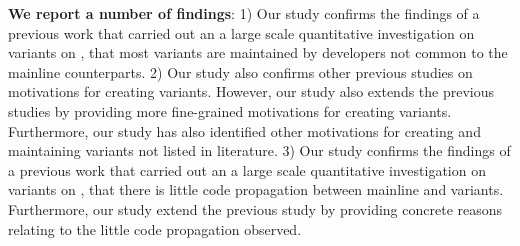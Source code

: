 \nd \textbf{We report a number of findings}: 1) Our study confirms the findings of a previous work that carried out an a large scale quantitative investigation on variants on \gh, that most variants are maintained by developers not common to the mainline counterparts. 2) Our study also confirms other previous studies on motivations for creating variants. However, our study also extends the previous studies by providing more fine-grained motivations for creating variants. Furthermore, our study has also identified other motivations for creating and maintaining variants not listed in literature. 3) Our study confirms the findings of a previous work that carried out an a large scale quantitative investigation on variants on \gh, that there is little code propagation between mainline and variants. Furthermore, our study extend the previous study by providing concrete reasons relating to the little code propagation observed.

